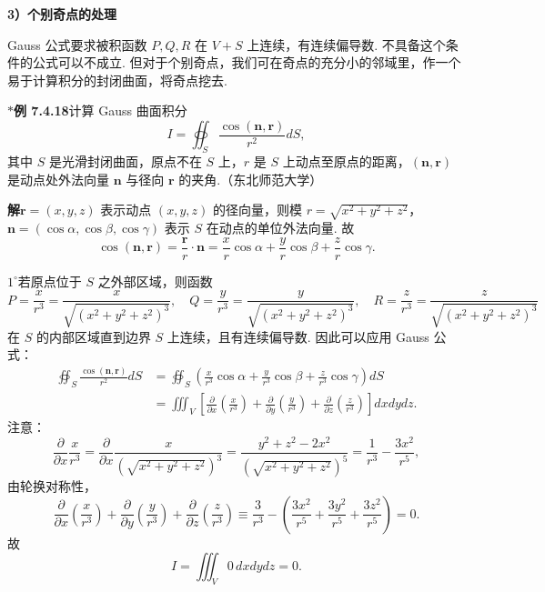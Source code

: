 \documentclass[UTF8,12pt,a4paper,fontset=fandol]{ctexart}
\begin{document}
\noindent\textbf{3）个别奇点的处理}

Gauss 公式要求被积函数 $P,Q,R$ 在 $V+S$ 上连续，有连续偏导数. 不具备这个条件的公式可以不成立. 但对于个别奇点，我们可在奇点的充分小的邻域里，作一个易于计算积分的封闭曲面，将奇点挖去.

\noindent\textbf{$*$例 7.4.18}\quad 计算 Gauss 曲面积分
\[
I=\oiint_S\frac{\cos(\mathbf n,\mathbf r)}{r^2}dS,
\]
其中 $S$ 是光滑封闭曲面，原点不在 $S$ 上，$r$ 是 $S$ 上动点至原点的距离，$(\mathbf n,\mathbf r)$ 是动点处外法向量 $\mathbf n$ 与径向 $\mathbf r$ 的夹角.（东北师范大学）

\noindent\textbf{解}\quad $\mathbf r=(x,y,z)$ 表示动点 $(x,y,z)$ 的径向量，则模 $r=\sqrt{x^2+y^2+z^2}$，$\mathbf n=(\cos\alpha,\cos\beta,\cos\gamma)$ 表示 $S$ 在动点的单位外法向量. 故
\[
\cos(\mathbf n,\mathbf r)=\frac{\mathbf r}{r}\cdot\mathbf n
=\frac xr\cos\alpha+\frac yr\cos\beta+\frac zr\cos\gamma.
\]

\noindent\textbf{$1^\circ$}\quad 若原点位于 $S$ 之外部区域，则函数
\[
P=\frac{x}{r^3}=\frac{x}{\sqrt{(x^2+y^2+z^2)^3}},\quad
Q=\frac{y}{r^3}=\frac{y}{\sqrt{(x^2+y^2+z^2)^3}},\quad
R=\frac{z}{r^3}=\frac{z}{\sqrt{(x^2+y^2+z^2)^3}} \tag{1}
\]
在 $S$ 的内部区域直到边界 $S$ 上连续，且有连续偏导数. 因此可以应用 Gauss 公式：
\begin{equation}
\begin{aligned}
\oiint_S\frac{\cos(\mathbf n,\mathbf r)}{r^2}dS
&=\oiint_S\left(\frac x{r^3}\cos\alpha+\frac y{r^3}\cos\beta+\frac z{r^3}\cos\gamma\right)dS\\
&=\iiint_V\left[
\frac{\partial}{\partial x}\left(\frac x{r^3}\right)
+\frac{\partial}{\partial y}\left(\frac y{r^3}\right)
+\frac{\partial}{\partial z}\left(\frac z{r^3}\right)
\right]dxdydz.
\end{aligned}
\tag{2}
\end{equation}
注意：
\[
\frac{\partial}{\partial x}\frac x{r^3}
=\frac{\partial}{\partial x}\frac{x}{\left(\sqrt{x^2+y^2+z^2}\right)^3}
=\frac{y^2+z^2-2x^2}{\left(\sqrt{x^2+y^2+z^2}\right)^5}
=\frac1{r^3}-\frac{3x^2}{r^5},
\]
由轮换对称性，
\[
\frac{\partial}{\partial x}\left(\frac x{r^3}\right)
+\frac{\partial}{\partial y}\left(\frac y{r^3}\right)
+\frac{\partial}{\partial z}\left(\frac z{r^3}\right)
\equiv\frac3{r^3}-\left(\frac{3x^2}{r^5}+\frac{3y^2}{r^5}+\frac{3z^2}{r^5}\right)=0.
\]
故
\[
I=\iiint_V0\,dxdydz=0.
\]
\end{document}
